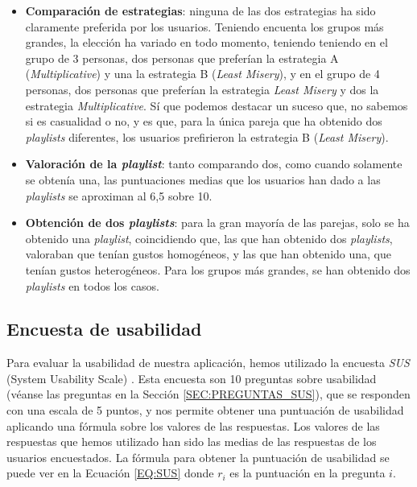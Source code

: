 \begin{itemize}
    \item \textbf{Comparación de estrategias}: ninguna de las dos estrategias ha sido claramente preferida por los usuarios. Teniendo encuenta los
     grupos más grandes, la elección ha variado en todo momento, teniendo teniendo en el grupo de 3 personas, dos personas que preferían la estrategia A (\textit{Multiplicative}) y una la estrategia B 
     (\textit{Least Misery}), y en el grupo de 4 personas, dos personas que preferían la estrategia \textit{Least Misery} y dos la estrategia \textit{Multiplicative}. Sí que podemos destacar un suceso 
     que, no sabemos si es casualidad o no, y es que, para la única pareja que ha obtenido dos \textit{playlists} diferentes, los usuarios prefirieron la estrategia B (\textit{Least Misery}).
    \item \textbf{Valoración de la \textit{playlist}}: tanto comparando dos, como cuando solamente se obtenía una, las puntuaciones medias
    que los usuarios han dado a las \textit{playlists} se aproximan al 6,5 sobre 10.
    \item \textbf{Obtención de dos \textit{playlists}}: para la gran mayoría de las parejas, solo se ha obtenido una \textit{playlist}, coincidiendo
    que, las que han obtenido dos \textit{playlists}, valoraban que tenían gustos homogéneos, y las que han obtenido una, que tenían gustos heterogéneos.
    Para los grupos más grandes, se han obtenido dos \textit{playlists} en todos los casos.
\end{itemize}

\subsection{Encuesta de usabilidad\label{SEC:ENCUESTA_USABILIDAD}}

Para evaluar la usabilidad de nuestra aplicación, hemos utilizado la encuesta \textit{SUS} (System Usability Scale) 
\cite{brooke1986system}. Esta encuesta son 10 preguntas sobre usabilidad (véanse las preguntas en la Sección \ref{SEC:PREGUNTAS_SUS}), 
que se responden con una escala de 5 puntos, y nos permite obtener una puntuación de usabilidad aplicando una fórmula sobre los valores 
de las respuestas. Los valores de las respuestas que hemos utilizado han sido las medias de las respuestas de los usuarios encuestados. 
La fórmula para obtener la puntuación de usabilidad se puede ver en la Ecuación \ref{EQ:SUS} donde $r_i$ es la puntuación en la pregunta
$i$.

